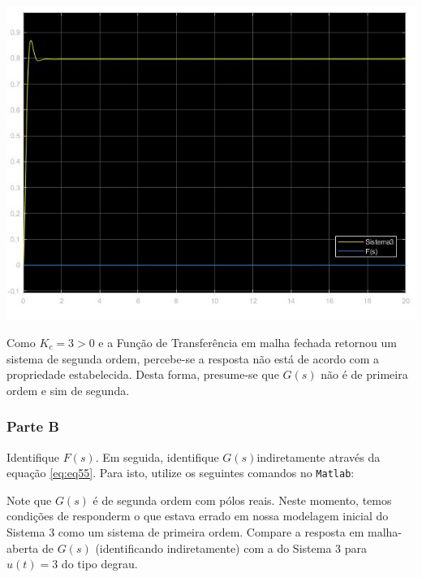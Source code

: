 \documentclass[
]{book}
\newenvironment{Shaded}{\begin{snugshade}}{\end{snugshade}}
\newcommand{\CommentTok}[1]{\textcolor[rgb]{0.56,0.35,0.01}{\textit{#1}}}
\newcommand{\FloatTok}[1]{\textcolor[rgb]{0.00,0.00,0.81}{#1}}
\newcommand{\NormalTok}[1]{#1}
\theoremstyle{definition}
\theoremstyle{definition}
\theoremstyle{definition}
\theoremstyle{remark}
\begin{document}
\includegraphics{Imagens/Lab3/Resolução/prob3AC.jpg}

Como \(K_c = 3 > 0\) e a Função de Transferência em malha fechada retornou um sistema de segunda ordem, percebe-se a resposta não está de acordo com a propriedade estabelecida. Desta forma, presume-se que \(G(s)\) não é de primeira ordem e sim de segunda.

\hypertarget{parte-b}{%
\subsubsection*{Parte B}\label{parte-b}}

Identifique \(F(s)\). Em seguida, identifique \(G(s)\)indiretamente através da equação \eqref{eq:eq55}. Para isto, utilize os seguintes comandos no \texttt{Matlab}:

\begin{Shaded}
\end{Shaded}

Note que \(G(s)\) é de segunda ordem com pólos reais. Neste momento, temos condições de responderm o que estava errado em nossa modelagem inicial do Sistema 3 como um sistema de primeira ordem. Compare a resposta em malha-aberta de \(G(s)\) (identificando indiretamente) com a do Sistema 3 para \(u(t) = 3\) do tipo degrau.
\end{document}
